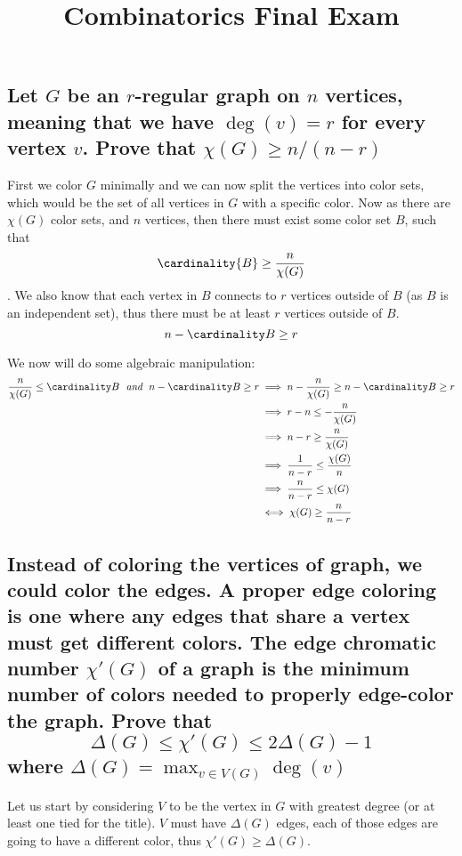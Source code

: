 \documentclass{article}
\title{Combinatorics Final Exam}
\theoremstyle{definition}
\begin{document}
	\maketitle
	\section{}
	\subsection{Let $G$ be an $r$-regular graph on $n$ vertices, meaning that we have $\deg(v) = r$ for every vertex $v$. Prove that $\chi(G) \ge n/(n-r)$}
	
	First we color $G$ minimally and we can now split the vertices into color sets, which would be the set of all vertices in $G$ with a specific color. Now as there are $\chi(G)$ color sets, and $n$ vertices, then there must exist some color set $B$, such that $$\cardinality{B} \ge \frac{n}{\chi(G)}$$. We also know that each vertex in $B$ connects to $r$ vertices outside of $B$ (as $B$ is an independent set), thus there must be at least $r$ vertices outside of $B$. $$n-\cardinality B \ge r$$
	
	We now will do some algebraic manipulation:
	\begin{align*}
		\frac n{\chi(G)} \le \cardinality B \;\And\; n-\cardinality B \ge r &\implies n-\frac n{\chi(G)} \ge n-\cardinality B \ge r\\
		&\implies r-n \le -\frac n{\chi(G)} \\
		&\implies n-r \ge \frac n{\chi(G)} \\
		&\implies \frac 1{n-r} \le \frac{\chi(G)}n \\
		&\implies \frac n{n-r} \le \chi(G) \\
		&\iff \chi(G) \ge \frac n{n-r}
	\end{align*}
	
	
	\subsection{Instead of coloring the vertices of  graph, we could color the \textbf{edges}. A proper edge coloring is one where any edges that share a vertex must get different colors. The \textbf{edge chromatic number} $\chi'(G)$ of a graph is the minimum number of colors needed to properly edge-color the graph. Prove that $$\Delta(G) \le \chi'(G) \le 2\Delta(G) - 1$$ where $\Delta(G) = \max_{v\in V(G)}\deg(v)$}
	
	Let us start by considering $V$ to be the vertex in $G$ with greatest degree (or at least one tied for the title).
	$V$ must have $\Delta(G)$ edges, each of those edges are going to have a different color, thus $\chi'(G) \ge \Delta(G)$.
	
\end{document}
